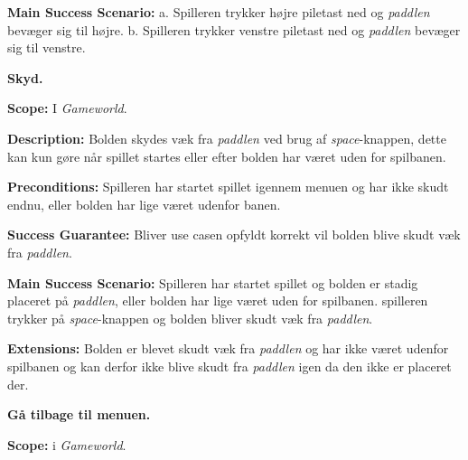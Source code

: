 \textbf{Main Success Scenario:}\newline
 a. Spilleren trykker højre piletast ned og \textit{paddlen} bevæger sig til højre.\newline
 b. Spilleren trykker venstre piletast ned og \textit{paddlen} bevæger sig til venstre.\newline \newline


\textbf{Skyd.}\newline

\textbf{Scope:}\newline
I \textit{Gameworld}.\newline

\textbf{Description:} \newline
Bolden skydes væk fra \textit{paddlen} ved brug af \textit{space}-knappen, dette kan kun gøre når spillet startes eller efter bolden har været uden for spilbanen. \newline

\textbf{Preconditions:}\newline
Spilleren har startet spillet igennem menuen og har ikke skudt endnu, eller bolden har lige været udenfor banen.\newline

\textbf{Success Guarantee:}\newline
Bliver use casen opfyldt korrekt vil bolden blive skudt væk fra \textit{paddlen}.\newline

\textbf{Main Success Scenario:}\newline
Spilleren har startet spillet og bolden er stadig placeret på \textit{paddlen}, eller bolden har lige været uden for spilbanen. spilleren trykker på \textit{space}-knappen og bolden bliver skudt væk fra \textit{paddlen}.\newline

\textbf{Extensions:}\newline
Bolden er blevet skudt væk fra \textit{paddlen} og har ikke været udenfor spilbanen og kan derfor ikke blive skudt fra \textit{paddlen} igen da den ikke er placeret der.\newline \newline


\textbf{Gå tilbage til menuen.}\newline

\textbf{Scope:}\newline
i \textit{Gameworld}.\newline

